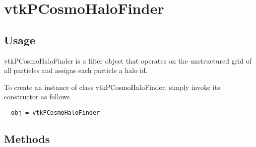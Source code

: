 \section{vtkPCosmoHaloFinder}

\subsection{Usage}

 vtkPCosmoHaloFinder is a filter object that operates on the unstructured 
 grid of all particles and assigns each particle a halo id.


To create an instance of class vtkPCosmoHaloFinder, simply
invoke its constructor as follows
\begin{verbatim}
  obj = vtkPCosmoHaloFinder
\end{verbatim}
\subsection{Methods}


